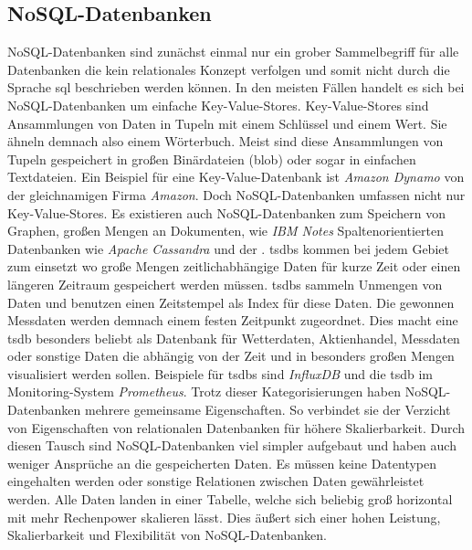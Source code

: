 \documentclass[titlepage]{report}
\begin{document}
\subsection*{NoSQL\hyp{}Datenbanken}
NoSQL\hyp{}Datenbanken sind zunächst einmal nur ein grober Sammelbegriff
für alle Datenbanken die kein relationales Konzept verfolgen und somit
nicht durch die Sprache \gls{sql} beschrieben werden können. In den
meisten Fällen handelt es sich bei NoSQL\hyp{}Datenbanken um einfache
Key\hyp{}Value\hyp{}Stores. Key\hyp{}Value\hyp{}Stores sind Ansammlungen
von Daten in Tupeln mit einem Schlüssel und einem Wert. Sie ähneln
demnach also einem Wörterbuch.  Meist sind diese Ansammlungen von Tupeln
gespeichert in großen Binärdateien (\gls{blob})
oder sogar in einfachen Textdateien. Ein Beispiel für eine
Key\hyp{}Value\hyp{}Datenbank ist \emph{Amazon Dynamo} von der
gleichnamigen Firma \emph{Amazon}. Doch NoSQL\hyp{}Datenbanken umfassen
nicht nur Key\hyp{}Value\hyp{}Stores. Es existieren auch
NoSQL\hyp{}Datenbanken zum Speichern von Graphen, großen Mengen an
Dokumenten, wie \emph{IBM Notes} Spaltenorientierten Datenbanken wie
\emph{Apache Cassandra} und der .  \glspl{tsdb} kommen
bei jedem Gebiet zum einsetzt wo große Mengen zeitlichabhängige Daten
für kurze Zeit oder einen längeren Zeitraum gespeichert werden müssen.
\glspl{tsdb} sammeln Unmengen von Daten und benutzen einen Zeitstempel
als Index für diese Daten. Die gewonnen Messdaten werden demnach einem
festen Zeitpunkt zugeordnet. Dies macht eine \gls{tsdb} besonders
beliebt als Datenbank für Wetterdaten, Aktienhandel, Messdaten oder
sonstige Daten die abhängig von der Zeit und in besonders großen Mengen
visualisiert werden sollen. Beispiele für \glspl{tsdb} sind
\emph{InfluxDB} und die \gls{tsdb} im Monitoring-System
\emph{Prometheus}. Trotz dieser Kategorisierungen haben
NoSQL\hyp{}Datenbanken mehrere gemeinsame Eigenschaften. So verbindet
sie der Verzicht von Eigenschaften von relationalen Datenbanken für
höhere Skalierbarkeit\cite[S. 13]{TSDB}. Durch diesen Tausch sind
NoSQL\hyp{}Datenbanken viel simpler aufgebaut und haben auch weniger
Ansprüche an die gespeicherten Daten. Es müssen keine Datentypen
eingehalten werden oder sonstige Relationen zwischen Daten gewährleistet
werden. Alle Daten landen in einer Tabelle, welche sich beliebig groß
horizontal mit mehr Rechenpower skalieren lässt. Dies äußert sich einer
hohen Leistung, Skalierbarkeit und Flexibilität von
NoSQL\hyp{}Datenbanken\cite{NOSQL}.
\end{document}
